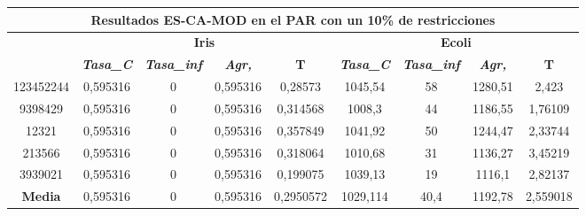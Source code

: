\documentclass[12pt, spanish]{article}
\begin{document}
\begin{table}[H]
\begin{tabular}{|c|c|c|c|c|c|c|c|c|}
\hline
\multicolumn{9}{|c|}{\textbf{Resultados ES-CA-MOD en el PAR con un 10\% de restricciones}}                                                                                                                        \\ \hline
\multirow{2}{*}{} & \multicolumn{4}{c|}{\textbf{Iris}}                                                            & \multicolumn{4}{c|}{\textbf{Ecoli}}                                                           \\ \cline{2-9} 
                  & \textit{\textbf{Tasa\_C}} & \textit{\textbf{Tasa\_inf}} & \textit{\textbf{Agr,}} & \textbf{T} & \textit{\textbf{Tasa\_C}} & \textit{\textbf{Tasa\_inf}} & \textit{\textbf{Agr,}} & \textbf{T} \\ \hline
123452244         & 0,595316                  & 0                           & 0,595316               & 0,28573    & 1045,54                   & 58                          & 1280,51                & 2,423      \\ \hline
9398429           & 0,595316                  & 0                           & 0,595316               & 0,314568   & 1008,3                    & 44                          & 1186,55                & 1,76109    \\ \hline
12321             & 0,595316                  & 0                           & 0,595316               & 0,357849   & 1041,92                   & 50                          & 1244,47                & 2,33744    \\ \hline
213566            & 0,595316                  & 0                           & 0,595316               & 0,318064   & 1010,68                   & 31                          & 1136,27                & 3,45219    \\ \hline
3939021           & 0,595316                  & 0                           & 0,595316               & 0,199075   & 1039,13                   & 19                          & 1116,1                 & 2,82137    \\ \hline
\textbf{Media}    & 0,595316                  & 0                           & 0,595316               & 0,2950572  & 1029,114                  & 40,4                        & 1192,78                & 2,559018   \\ \hline
\end{tabular}
\end{table}
\end{document}
